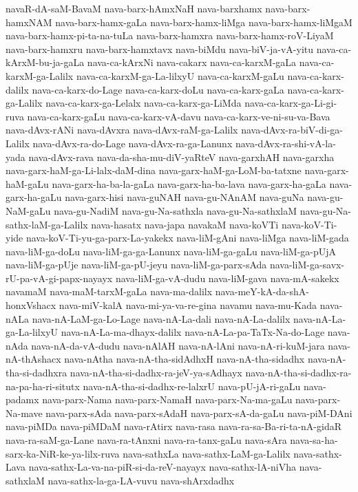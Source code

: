 {navaR-dA-saM-BavaM
nava-barx-hAmxNaH
nava-barxhamx
nava-barx-hamxNAM
nava-barx-hamx-gaLa
nava-barx-hamx-liMga
nava-barx-hamx-liMgaM
nava-barx-hamx-pi-ta-na-tuLa
nava-barx-hamxra
nava-barx-hamx-roV-LiyaM
nava-barx-hamxru
nava-barx-hamxtavx
nava-biMdu
nava-biV-ja-vA-yitu
nava-ca-kArxM-bu-ja-gaLa
nava-ca-kArxNi
nava-cakarx
nava-ca-karxM-gaLa
nava-ca-karxM-ga-Lalilx
nava-ca-karxM-ga-La-lilxyU
nava-ca-karxM-gaLu
nava-ca-karx-dalilx
nava-ca-karx-do-Lage
nava-ca-karx-doLu
nava-ca-karx-gaLa
nava-ca-karx-ga-Lalilx
nava-ca-karx-ga-Lelalx
nava-ca-karx-ga-LiMda
nava-ca-karx-ga-Li-gi-ruva
nava-ca-karx-gaLu
nava-ca-karx-vA-davu
nava-ca-karx-ve-ni-su-va-Bava
nava-dAvx-rANi
nava-dAvxra
nava-dAvx-raM-ga-Lalilx
nava-dAvx-ra-biV-di-ga-Lalilx
nava-dAvx-ra-do-Lage
nava-dAvx-ra-ga-Lanunx
nava-dAvx-ra-shi-vA-la-yada
nava-dAvx-rava
nava-da-sha-mu-diV-yaRteV
nava-garxhAH
nava-garxha
nava-garx-haM-ga-Li-lalx-daM-dina
nava-garx-haM-ga-LoM-ba-tatxne
nava-garx-haM-gaLu
nava-garx-ha-ba-la-gaLa
nava-garx-ha-ba-lava
nava-garx-ha-gaLa
nava-garx-ha-gaLu
nava-garx-hisi
nava-guNAH
nava-gu-NAnAM
nava-guNa
nava-gu-NaM-gaLu
nava-gu-NadiM
nava-gu-Na-sathxla
nava-gu-Na-sathxlaM
nava-gu-Na-sathx-laM-ga-Lalilx
nava-hasatx
nava-japa
navakaM
nava-koVTi
nava-koV-Ti-yide
nava-koV-Ti-yu-ga-parx-La-yakekx
nava-liM-gAni
nava-liMga
nava-liM-gada
nava-liM-ga-doLu
nava-liM-ga-ga-Lanunx
nava-liM-ga-gaLu
nava-liM-ga-pUjA
nava-liM-ga-pUje
nava-liM-ga-pU-jeyu
nava-liM-ga-parx-sAda
nava-liM-ga-savx-rU-pa-vA-gi-papx-nayayx
nava-liM-ga-vA-dudu
nava-liM-gava
nava-mA-sakekx
navamaM
nava-maM-tarxM-gaLa
nava-ma-dalilx
nava-meY-kA-da-shA-honxVshacx
nava-miV-kalA
nava-mi-ya-va-re-gina
navamu
nava-mu-Kada
nava-nALa
nava-nA-LaM-ga-Lo-Lage
nava-nA-La-dali
nava-nA-La-dalilx
nava-nA-La-ga-La-lilxyU
nava-nA-La-ma-dhayx-dalilx
nava-nA-La-pa-TaTx-Na-do-Lage
nava-nAda
nava-nA-da-vA-dudu
nava-nAlAH
nava-nA-lAni
nava-nA-ri-kuM-jara
nava-nA-thAshacx
nava-nAtha
nava-nA-tha-sidAdhxH
nava-nA-tha-sidadhx
nava-nA-tha-si-dadhxra
nava-nA-tha-si-dadhx-ra-jeV-ya-sAdhayx
nava-nA-tha-si-dadhx-ra-na-pa-ha-ri-situtx
nava-nA-tha-si-dadhx-re-lalxrU
nava-pU-jA-ri-gaLu
nava-padamx
nava-parx-Nama
nava-parx-NamaH
nava-parx-Na-ma-gaLu
nava-parx-Na-mave
nava-parx-sAda
nava-parx-sAdaH
nava-parx-sA-da-gaLu
nava-piM-DAni
nava-piMDa
nava-piMDaM
nava-rAtirx
nava-rasa
nava-ra-sa-Ba-ri-ta-nA-gidaR
nava-ra-saM-ga-Lane
nava-ra-tAnxni
nava-ra-tanx-gaLu
nava-sAra
nava-sa-ha-sarx-ka-NiR-ke-ya-lilx-ruva
nava-sathxLa
nava-sathx-LaM-ga-Lalilx
nava-sathx-Lava
nava-sathx-La-va-na-piR-si-da-reV-nayayx
nava-sathx-lA-niVha
nava-sathxlaM
nava-sathx-la-ga-LA-vuvu
nava-shArxdadhx
}

